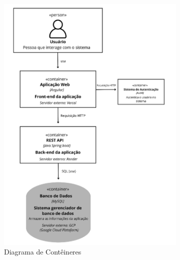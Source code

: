 \documentclass[
	article,			%
	12pt,				%
	oneside,			%
	a4paper,			%
    BIBLATEX,           %
	english,			%
	brazil,				%
	sumario=tradicional
	]{abntex2}
\begin{document}
\begin{figure}[h!]
    \centering
    \caption{Diagramas da Arquitetura de Software}
    \begin{subfigure}[b]{0.45\textwidth}
        \centering
        \includegraphics[width=\textwidth]{Figuras/diagrama_conteineres.jpg}
        \caption{Diagrama de Contêineres}
        \label{fig:diagrama-conteineres}
    \end{subfigure}
    \hfill
    \begin{subfigure}[b]{0.45\textwidth}
        \centering

\end{subfigure}
\end{figure}
\end{document}
